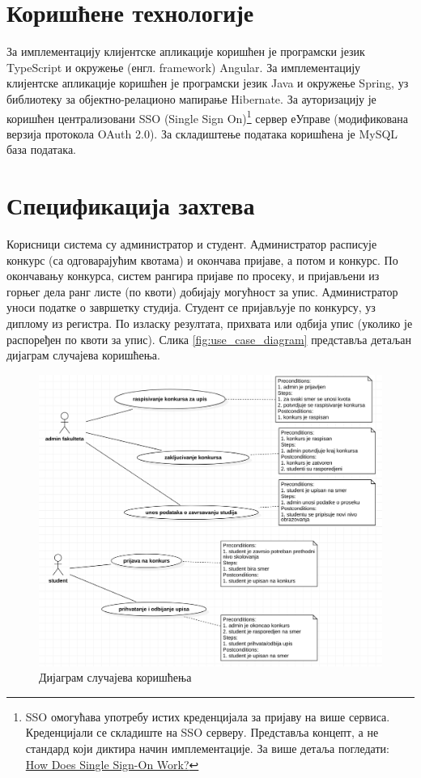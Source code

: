 \documentclass[a4paper]{article}
\begin{document}
\section*{Коришћене технологије}

За имплементацију клијентске апликације коришћен је програмски језик TypeScript\cite{typescript} и окружење (енгл. framework) Angular\cite{angular}.
За имплементацију клијентске апликације коришћен је програмски језик Java\cite{java} и окружење Spring\cite{spring}, уз библиотеку за објектно-релационо мапирање Hibernate\cite{hibernate}.
За ауторизацију је коришћен централизовани SSO (Single Sign On)\footnote{SSO омогућава употребу истих креденцијала за пријаву на више сервиса. Креденцијали се складиште на SSO серверу. Представља концепт, а не стандард који диктира начин имплементације. За више детаља погледати: \href{https://www.onelogin.com/learn/how-single-sign-on-works}{How Does Single Sign-On Work?}}
сервер еУправе (модификована верзија протокола OAuth 2.0\cite{oauth}).
За складиштење података коришћена је MySQL\cite{mysql} база података.

\section*{Спецификација захтева}

Корисници система су администратор и студент. Администратор расписује конкурс (са одговарајућим квотама) и окончава пријаве,
а потом и конкурс. По окончавању конкурса, систем рангира пријаве по просеку, и пријављени из горњег дела ранг листе
(по квоти) добијају могућност за упис. Администратор уноси податке о завршетку студија. Студент се пријављује по конкурсу, уз диплому из регистра. По изласку резултата, прихвата или одбија упис (уколико је распоређен по квоти за упис). Слика \autoref{fig:use_case_diagram} представља детаљан дијаграм случајева коришћења.

\begin{figure}[H]
    \centering
    \includegraphics{images/use_case_diagram.png}
    \caption{Дијаграм случајева коришћења}
    \label{fig:use_case_diagram}
\end{figure}
\end{document}
